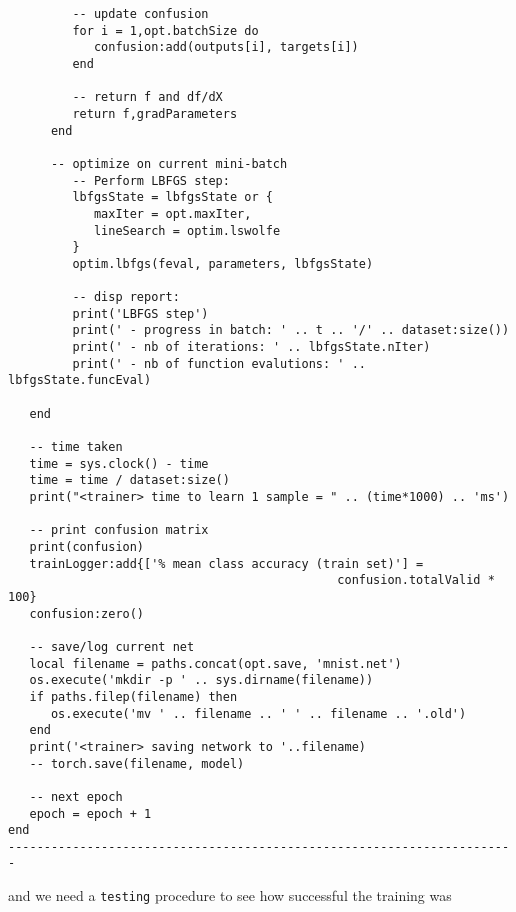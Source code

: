 \begin{verbatim}
         -- update confusion
         for i = 1,opt.batchSize do
            confusion:add(outputs[i], targets[i])
         end

         -- return f and df/dX
         return f,gradParameters
      end

      -- optimize on current mini-batch
         -- Perform LBFGS step:
         lbfgsState = lbfgsState or {
            maxIter = opt.maxIter,
            lineSearch = optim.lswolfe
         }
         optim.lbfgs(feval, parameters, lbfgsState)

         -- disp report:
         print('LBFGS step')
         print(' - progress in batch: ' .. t .. '/' .. dataset:size())
         print(' - nb of iterations: ' .. lbfgsState.nIter)
         print(' - nb of function evalutions: ' .. lbfgsState.funcEval)

   end

   -- time taken
   time = sys.clock() - time
   time = time / dataset:size()
   print("<trainer> time to learn 1 sample = " .. (time*1000) .. 'ms')

   -- print confusion matrix
   print(confusion)
   trainLogger:add{['% mean class accuracy (train set)'] = 
                                              confusion.totalValid * 100}
   confusion:zero()

   -- save/log current net
   local filename = paths.concat(opt.save, 'mnist.net')
   os.execute('mkdir -p ' .. sys.dirname(filename))
   if paths.filep(filename) then
      os.execute('mv ' .. filename .. ' ' .. filename .. '.old')
   end
   print('<trainer> saving network to '..filename)
   -- torch.save(filename, model)

   -- next epoch
   epoch = epoch + 1
end
-----------------------------------------------------------------------
\end{verbatim}

and we need a {\tt testing} procedure to see how successful the training was

